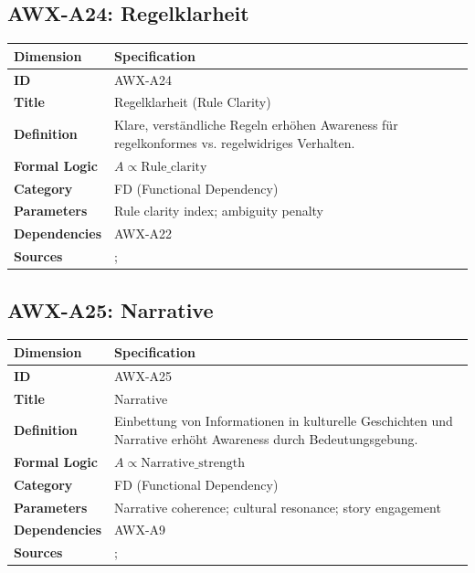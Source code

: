 
\subsection{AWX-A24: Regelklarheit}

\begin{table}[htbp]
\small
\begin{tabular}{p{3cm}p{11cm}}
\toprule
\textbf{Dimension} & \textbf{Specification} \\
\midrule
\textbf{ID} & AWX-A24 \\
\textbf{Title} & Regelklarheit (Rule Clarity) \\
\textbf{Definition} & Klare, verständliche Regeln erhöhen Awareness für regelkonformes vs. regelwidriges Verhalten. \\
\textbf{Formal Logic} & $A \propto \text{Rule\_clarity}$ \\
\textbf{Category} & FD (Functional Dependency) \\
\textbf{Parameters} & Rule clarity index; ambiguity penalty \\
\textbf{Dependencies} & AWX-A22 \\
\textbf{Sources} & \citet{PAP-PAP-north1990institutionsinstitutions}; \citet{ostrom1990governing} \\
\bottomrule
\end{tabular}
\end{table}


\subsection{AWX-A25: Narrative}

\begin{table}[htbp]
\small
\begin{tabular}{p{3cm}p{11cm}}
\toprule
\textbf{Dimension} & \textbf{Specification} \\
\midrule
\textbf{ID} & AWX-A25 \\
\textbf{Title} & Narrative \\
\textbf{Definition} & Einbettung von Informationen in kulturelle Geschichten und Narrative erhöht Awareness durch Bedeutungsgebung. \\
\textbf{Formal Logic} & $A \propto \text{Narrative\_strength}$ \\
\textbf{Category} & FD (Functional Dependency) \\
\textbf{Parameters} & Narrative coherence; cultural resonance; story engagement \\
\textbf{Dependencies} & AWX-A9 \\
\textbf{Sources} & \citet{shiller2019narrative}; \citet{akerlof2009animal} \\
\bottomrule
\end{tabular}
\end{table}

